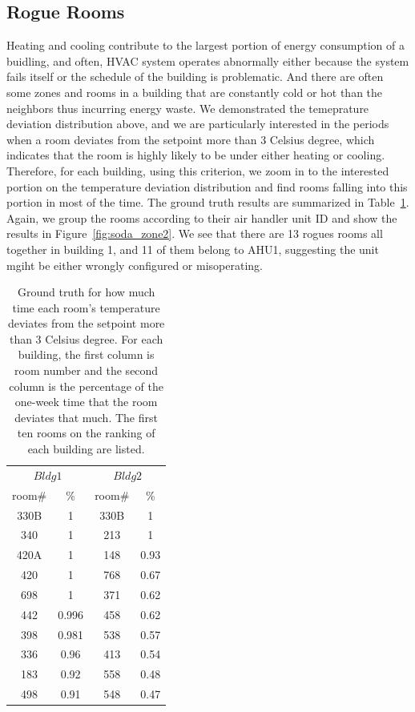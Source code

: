 \subsection{Rogue Rooms}
Heating and cooling contribute to the largest portion of energy consumption of a buidling, and often, HVAC system operates abnormally either because the system fails itself or the schedule of the building is problematic. And there are often some zones and rooms in a building that are constantly cold or hot than the neighbors thus incurring energy waste. We demonstrated the temeprature deviation distribution above, and we are particularly interested in the periods when a room deviates from the setpoint more than 3 Celsius degree, which indicates that the room is highly likely to be under either heating or cooling. Therefore, for each building, using this criterion, we zoom in to the interested portion on the temperature deviation distribution and find rooms falling into this portion in most of the time. The ground truth results are summarized in Table~\ref{tab:rogue}. Again, we group the rooms according to their air handler unit ID and show the results in Figure~\ref{fig:soda_zone2}. We see that there are 13 rogues rooms all together in building 1, and 11 of them belong to AHU1, suggesting the unit mgiht be either wrongly configured or misoperating.

\begin{table}[h!]
 \begin{center}
	\begin{tabular}{|c|c|c|c|}
	\multicolumn{2}{c}{$Bldg 1$}
	 & \multicolumn{2}{c}{$Bldg 2$}\\
	\cline{1-4} 
	 room\# & \% & room\# & \%\\
	\cline{1-4}
	 330B & 1 & 330B & 1\\
	\cline{1-4}
	 340 & 1 & 213 & 1\\
	\cline{1-4}
	420A & 1 & 148 & 0.93\\
	\cline{1-4}
	420 & 1 & 768 & 0.67\\
	\cline{1-4}
	698 & 1 & 371 & 0.62\\
	\cline{1-4}
	442 & 0.996 & 458 & 0.62\\
	\cline{1-4}
	398 & 0.981 & 538 & 0.57\\
	\cline{1-4}
	336 & 0.96 & 413 & 0.54\\
	\cline{1-4}
	183 & 0.92 & 558 & 0.48\\
	\cline{1-4}
	498 & 0.91 & 548 & 0.47\\
	\cline{1-4}
	\end{tabular}
 \end{center}
 \caption{Ground truth for how much time each room's temperature deviates from the setpoint more than 3 Celsius degree. For each building, the first column is room number and the second column is the percentage of the one-week time that the room deviates that much. The first ten rooms on the ranking of each building are listed.}
 \label{tab:rogue}
\end{table}


